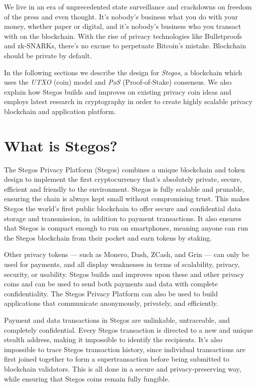 \documentclass[a4paper, 10pt, conference]{ieeeconf}
\begin{document}
We live in an era of unprecedented state surveillance and crackdowns on freedom of the press and even thought. It’s nobody’s business what you do with your money, whether paper or digital, and it’s nobody's business who you transact with on the blockchain. With the rise of privacy technologies like Bulletproofs and zk-SNARKs, there’s no excuse to perpetuate Bitcoin’s mistake. Blockchain should be private by default.

In the following sections we describe the design for \textit{Stegos}, a blockchain which uses the \textit{UTXO} (coin) model and \textit{PoS} (Proof-of-Stake) consensus. We also explain how Stegos builds and improves on existing privacy coin ideas and employs latest research in cryptography in order to create highly scalable privacy blockchain and application platform. 

\section{What is Stegos?}
The Stegos Privacy Platform (Stegos) combines a unique blockchain and token design to implement the first cryptocurrency that’s absolutely private, secure, efficient and friendly to the environment. Stegos is fully scalable and prunable, ensuring the chain is always kept small without compromising trust. This makes Stegos the world’s first public blockchain to offer secure and confidential data storage and transmission, in addition to payment transactions. It also ensures that Stegos is compact enough to run on smartphones, meaning anyone can run the Stegos blockchain from their pocket and earn tokens by staking.

Other privacy tokens — such as Monero, Dash, ZCash, and Grin — can only be used for payments, and all display weaknesses in terms of scalability, privacy, security, or usability. Stegos builds and improves upon these and other privacy coins and can be used to send both payments and data with complete confidentiality. The Stegos Privacy Platform can also be used to build applications that communicate anonymously, privately, and efficiently.

Payment and data transactions in Stegos are unlinkable, untraceable, and completely confidential. Every Stegos transaction is directed to a new and unique stealth address, making it impossible to identify the recipients. It’s also impossible to trace Stegos transaction history, since individual transactions are first joined together to form a supertransaction before being submitted to blockchain validators. This is all done in a secure and privacy-preserving way, while ensuring that Stegos coins remain fully fungible.
\end{document}
